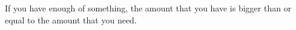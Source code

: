 If you have enough of something, the amount that you have is bigger than or equal 
to the amount that you need.